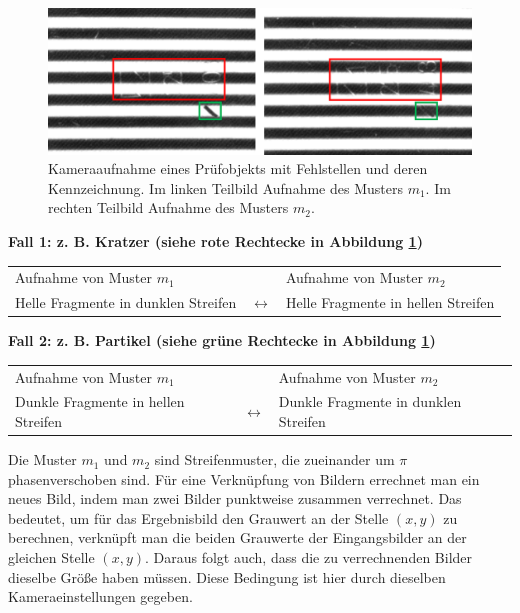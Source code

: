 \begin{figure}[H]
	\centering
	\includegraphics[width=\textwidth]{03_sichtpruefungDurchLichtstreuung/einsatzVonMehrerenStreifenmustern/figures/imageToLinkWithMarkings}
	\caption[Markierte Fehlstellen]{Kameraaufnahme eines Prüfobjekts mit Fehlstellen und deren Kennzeichnung. Im linken Teilbild Aufnahme des Musters $m_1$. Im rechten Teilbild Aufnahme des Musters $m_2$.}
	\label{img:imageToLinkWithMarkings}
\end{figure}

\noindent
\textbf{Fall 1: z. B. Kratzer (siehe rote Rechtecke in Abbildung \ref{img:imageToLinkWithMarkings})}
\nopagebreak
\par\medskip\noindent
\begin{tabular}{@{} p{} c p{} @{}}
	Aufnahme von Muster $m_1$ &  & Aufnahme von Muster $m_2$ \\ 
	Helle Fragmente in dunklen Streifen & $ \longleftrightarrow $ & Helle Fragmente in hellen Streifen \\ 
\end{tabular}

\p
\textbf{Fall 2: z. B. Partikel (siehe grüne Rechtecke in Abbildung \ref{img:imageToLinkWithMarkings})}
\nopagebreak
\par\medskip\noindent
\begin{tabular}{@{} p{} c p{} @{}}
	Aufnahme von Muster $m_1$ &  & Aufnahme von Muster $m_2$ \\ 
	Dunkle Fragmente in hellen Streifen & $ \longleftrightarrow $ & Dunkle Fragmente in dunklen Streifen \\ 
\end{tabular}

\p
Die Muster $m_1$ und $m_2$ sind Streifenmuster, die zueinander um $ \pi $ phasenverschoben sind.
Für eine Verknüpfung von Bildern errechnet man ein neues Bild, indem man zwei Bilder punktweise zusammen verrechnet.
Das bedeutet, um für das Ergebnisbild den Grauwert an der Stelle $ (x,y) $ zu berechnen, verknüpft man die beiden Grauwerte der Eingangsbilder an der gleichen Stelle $ (x,y) $.
Daraus folgt auch, dass die zu verrechnenden Bilder dieselbe Größe haben müssen.
Diese Bedingung ist hier durch dieselben Kameraeinstellungen gegeben.


